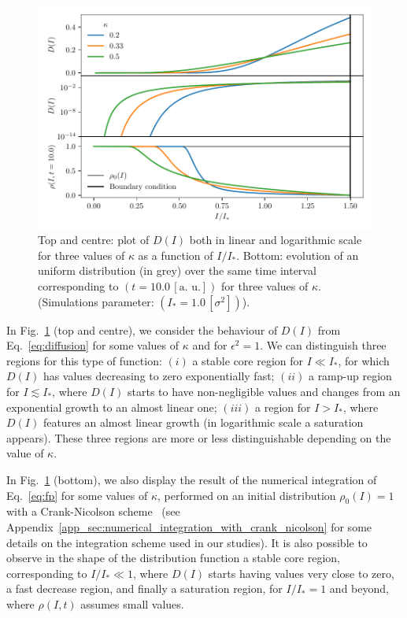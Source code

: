\begin{figure}[t]
    \centering
    \includegraphics[width=\textwidth]{4_probing_the_diffusive_behavior/figs/diffusion_coefficient.pdf}
    \caption{Top and centre: plot of $D(I)$ both in linear and logarithmic scale for three values of $\kappa$ as a function of $I/I_\ast$.
    Bottom: evolution of an uniform distribution (in grey) over the same time interval corresponding to $(t=10.0 \, [\text{a. u.}])$ for three values of $\kappa$. (Simulations parameter: $(I_\ast = 1.0\,[\sigma^2])$).}
    \label{fig:1}
\end{figure}

In Fig.~\ref{fig:1} (top and centre), we consider the behaviour of $D(I)$ from Eq.~\eqref{eq:diffusion} for some values of $\kappa$ and for $\epsilon^2 = 1$. We can distinguish three regions for this type of function: $(i)$ a stable core region for $I \ll I_\ast$, for which $D(I)$ has values decreasing to zero exponentially fast; $(ii)$ a ramp-up region for $I \lesssim I_\ast$, where $D(I)$ starts to have non-negligible values and changes from an exponential growth to an almost linear one; $(iii)$ a region for $I >  I_\ast$, where $D(I)$ features an almost linear growth (in logarithmic scale a saturation appears). These three regions are more or less distinguishable depending on the value of $\kappa$. 

In Fig.~\ref{fig:1} (bottom), we also display the result of the numerical integration of Eq.~\eqref{eq:fp} for some values of $\kappa$, performed on an initial distribution $\rho_0(I)=1$ with a Crank-Nicolson scheme~\cite{crank1947practical} (see Appendix~\ref{app_sec:numerical_integration_with_crank_nicolson} for some details on the integration scheme used in our studies).
It is also possible to observe in the shape of the distribution function a stable core region, corresponding to $I/I_\ast \ll 1$, where $D(I)$ starts having values very close to zero, a fast decrease region, and finally a saturation region, for $I/I_\ast = 1$ and beyond, where $\rho(I, t)$ assumes small values.




